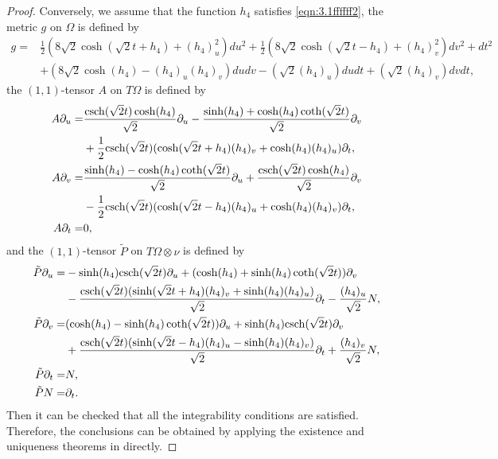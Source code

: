 \documentclass[reqno]{amsart}%
\theoremstyle{definition}
\numberwithin{equation}{section}
\begin{document}
\begin{proof}
Conversely, we assume that the function $h_4$ satisfies \eqref{eqn:3.1ffffff2}, the metric $g$ on $\Omega$ is defined by %
%
\begin{equation}\label{eqn:3.1ffffff3}
\begin{aligned}
g=&\frac{1}{2}(8\sqrt{2}\cosh(\sqrt{2}t+h_4)+(h_4)_u^2)du^2
+\frac{1}{2}(8\sqrt{2}\cosh(\sqrt{2}t-h_4)+(h_4)_v^2)dv^2+dt^2\\
&+(8\sqrt{2}\cosh(h_4)-(h_4)_u(h_4)_v)dudv-(\sqrt{2}(h_4)_u)dudt+(\sqrt{2}(h_4)_v)dvdt,
\end{aligned}
\end{equation}
the $(1,1)$-tensor $A$ on $T\Omega$ is defined by
\begin{equation}\label{eqn:3.1ffffff4}
\begin{aligned}
A\partial_u=&\frac{{\rm csch}(\sqrt{2}t)\cosh(h_4)}{\sqrt{2}}\partial_u
-\frac{\sinh(h_4)+\cosh(h_4)\coth(\sqrt{2}t)}{\sqrt{2}}\partial_v\\
&+\frac{1}{2}{\rm csch}(\sqrt{2}t)(\cosh(\sqrt{2}t+h_4)(h_4)_v+\cosh(h_4)(h_4)_u)\partial_t,\\
A\partial_v=&\frac{\sinh(h_4)-\cosh(h_4)\coth(\sqrt{2}t)}{\sqrt{2}}\partial_u+
\frac{{\rm csch}(\sqrt{2}t)\cosh(h_4)}{\sqrt{2}}\partial_v\\
&-\frac{1}{2}{\rm csch}(\sqrt{2}t)(\cosh(\sqrt{2}t-h_4)(h_4)_u+\cosh(h_4)(h_4)_v)\partial_t,\\
A\partial_t=&0,
\end{aligned}
\end{equation}
and the $(1,1)$-tensor $\tilde{P}$ on $T\Omega\otimes \nu$ is defined by
\begin{equation}\label{eqn:3.1ffffff5}
\begin{aligned}
\tilde{P}\partial_u=&-\sinh(h_4){\rm csch}(\sqrt{2}t)\partial_u+(\cosh(h_4)+\sinh(h_4)\coth(\sqrt{2}t))\partial_v\\
&-\frac{{\rm csch}(\sqrt{2}t)(\sinh(\sqrt{2}t+h_4)(h_4)_v+\sinh(h_4)(h_4)_u)}{\sqrt{2}}\partial_t-\frac{(h_4)_u}{\sqrt{2}}N,\\
\tilde{P}\partial_v=&(\cosh(h_4)-\sinh(h_4)\coth(\sqrt{2}t))\partial_u+\sinh(h_4){\rm csch}(\sqrt{2}t)\partial_v\\
&+\frac{{\rm csch}(\sqrt{2}t)(\sinh(\sqrt{2}t-h_4)(h_4)_u-\sinh(h_4)(h_4)_v)}{\sqrt{2}}\partial_t+\frac{(h_4)_v}{\sqrt{2}}N,\\
\tilde{P}\partial_t=&N,\\
\tilde{P}N=&\partial_t.\\	
\end{aligned}
\end{equation}
Then it can be  checked  that all the integrability conditions are satisfied.
Therefore, the conclusions can be obtained by applying  the existence and uniqueness theorems in  \cite{K,L-T-V} directly.
\end{proof}
\end{document}

